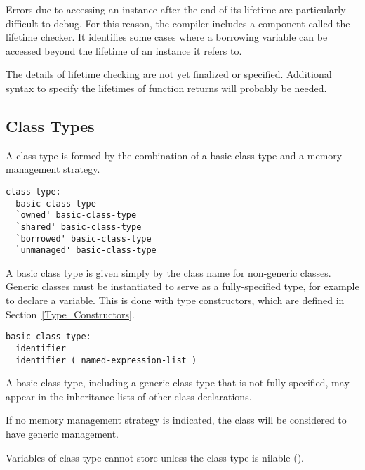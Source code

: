 Errors due to accessing an instance after the end of its lifetime are
particularly difficult to debug. For this reason, the compiler includes a
component called the lifetime checker. It identifies some cases where a
borrowing variable can be accessed beyond the lifetime of an instance it
refers to.

\begin{future}
  The details of lifetime checking are not yet finalized or specified.
  Additional syntax to specify the lifetimes of function returns will
  probably be needed.
\end{future}

\subsection{Class Types}
\label{Class_Types}

A class type is formed by the combination of a basic class type and a
memory management strategy.

\begin{syntax}
\begin{verbatim}
class-type:
  basic-class-type
  `owned' basic-class-type
  `shared' basic-class-type
  `borrowed' basic-class-type
  `unmanaged' basic-class-type
\end{verbatim}
\end{syntax}

A basic class type is given simply by the class name for non-generic classes.
Generic classes must be instantiated to serve as a fully-specified
type, for example to declare a variable.  This is done with
type constructors, which are defined in Section~\ref{Type_Constructors}.

\begin{syntax}
\begin{verbatim}
basic-class-type:
  identifier
  identifier ( named-expression-list )
\end{verbatim}
\end{syntax}

A basic class type, including a generic class type that is not
fully specified, may appear in the inheritance lists
of other class declarations.

If no memory management strategy is indicated, the class will be
considered to have generic management.

Variables of class type cannot store  unless the class
type is nilable ().

